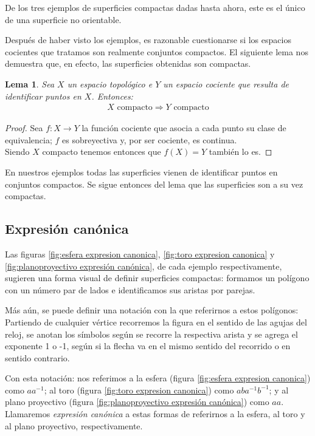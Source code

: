 \documentclass[a4paper,11pt,spanish, twoside, leqno]{tfg-uam}
\newtheorem{lema}[teor]{Lema}
\theoremstyle{definition}
\begin{document}
De los tres ejemplos de superficies compactas dadas hasta ahora, este es el único de una superficie no orientable. 

Después de haber visto los ejemplos, es razonable cuestionarse si los espacios cocientes que tratamos son realmente conjuntos compactos. El siguiente lema nos demuestra que, en efecto, las superficies obtenidas son compactas.

\begin{lema}\label{lema:compacidadDePoligonos}
Sea $X$ un espacio topológico e $Y$  un espacio cociente que resulta de identificar puntos en $X$. Entonces:
\begin{align*}
	\text{$X$ compacto}\Rightarrow\text{$Y$ compacto}
\end{align*}
\end{lema}

\begin{proof}
Sea $f:X\longrightarrow Y$ la función cociente que asocia a cada punto su clase de equivalencia; $f$ es sobreyectiva y, por ser cociente, es continua.\\
Siendo $X$ compacto tenemos entonces que $f(X)=Y$ también lo es.
\end{proof}

En nuestros ejemplos todas las superficies vienen de identificar puntos en conjuntos compactos. Se sigue entonces del lema que las superficies son a su vez compactas.


\subsection{Expresión canónica}
\label{subsec:expcanonica}

Las figuras \ref{fig:esfera expresion canonica}, \ref{fig:toro expresion canonica} y \ref{fig:planoproyectivo expresión canónica}, de cada ejemplo respectivamente, sugieren una forma visual de definir superficies compactas: formamos un polígono con un número par de lados e identificamos sus aristas por parejas. 

Más aún, se puede definir una notación con la que referirnos a estos polígonos: \\
Partiendo de cualquier vértice recorremos la figura en el sentido de las agujas del reloj, se anotan los símbolos según se recorre la respectiva arista y se agrega el exponente 1 o -1, según si la flecha va en el mismo sentido del recorrido o en sentido contrario.

Con esta notación: nos referimos  a la esfera (figura \ref{fig:esfera expresion canonica}) como $ aa^{-1} $; al toro (figura \ref{fig:toro expresion canonica})  como $ aba^{-1}b^{-1} $; y al plano proyectivo (figura \ref{fig:planoproyectivo expresión canónica}) como $ aa $. Llamaremos \textit{expresión canónica} a estas formas de referirnos a la esfera, al toro y al plano proyectivo, respectivamente.
\end{document}
